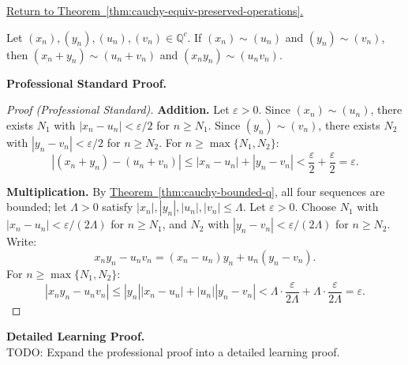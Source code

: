 
\newpage
{}
\label{prf:cauchy-equiv-preserved-operations}

\begin{remark*}[Return]
\hyperref[thm:cauchy-equiv-preserved-operations]{Return to Theorem~\ref*{thm:cauchy-equiv-preserved-operations}.}
\end{remark*}

\begin{theorem*}
Let $(x_n),(y_n),(u_n),(v_n) \in \mathbb{Q}^c$.
If $(x_n) \sim (u_n)$ and $(y_n) \sim (v_n)$, then
$(x_n + y_n) \sim (u_n + v_n)$ and $(x_n y_n) \sim (u_n v_n)$.
\end{theorem*}

\textbf{Professional Standard Proof.}~\\
\begin{proof}
[Proof (Professional Standard)]
\textbf{Addition.}
Let $\varepsilon > 0$.  Since $(x_n) \sim (u_n)$, there exists $N_1$ with
$|x_n - u_n| < \varepsilon/2$ for $n \geq N_1$.
Since $(y_n) \sim (v_n)$, there exists $N_2$ with
$|y_n - v_n| < \varepsilon/2$ for $n \geq N_2$.
For $n \geq \max\{N_1, N_2\}$:
\[
|(x_n + y_n) - (u_n + v_n)|
\leq |x_n - u_n| + |y_n - v_n|
< \frac{\varepsilon}{2} + \frac{\varepsilon}{2} = \varepsilon.
\]

\textbf{Multiplication.}
By \hyperref[thm:cauchy-bounded-q]{Theorem~\ref*{thm:cauchy-bounded-q}},
all four sequences are bounded; let $\Lambda > 0$ satisfy $|x_n|, |y_n|, |u_n|, |v_n| \leq \Lambda$.
Let $\varepsilon > 0$.  Choose $N_1$ with $|x_n - u_n| < \varepsilon/(2\Lambda)$ for $n \geq N_1$,
and $N_2$ with $|y_n - v_n| < \varepsilon/(2\Lambda)$ for $n \geq N_2$.
Write:
\[
x_n y_n - u_n v_n
= (x_n - u_n)y_n + u_n(y_n - v_n).
\]
For $n \geq \max\{N_1, N_2\}$:
\[
|x_n y_n - u_n v_n|
\leq |y_n||x_n - u_n| + |u_n||y_n - v_n|
< \Lambda \cdot \frac{\varepsilon}{2\Lambda} + \Lambda \cdot \frac{\varepsilon}{2\Lambda}
= \varepsilon.
\]
\end{proof}

\textbf{Detailed Learning Proof.}~\\
TODO: Expand the professional proof into a detailed learning proof.


